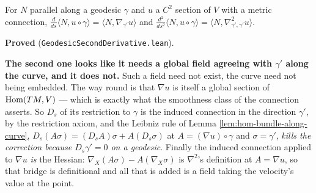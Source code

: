 \begin{lemma}
  \label{lem:geodesic-second-derivative}
  \leanok
  For $N$ parallel along a geodesic $\gamma$ and $u$ a $C^2$ section of $V$ with a metric
  connection,
  $\frac{d}{ds}\langle N, u\circ\gamma\rangle = \langle N, \nabla_{\gamma'}u\rangle$ and
  $\frac{d^2}{ds^2}\langle N, u\circ\gamma\rangle
   = \langle N, \nabla^2_{\gamma',\gamma'}u\rangle$.

  \textbf{Proved} (\texttt{GeodesicSecondDerivative.lean}).

  \textbf{The second one looks like it needs a global field agreeing with $\gamma'$ along the
  curve, and it does not.} Such a field need not exist, the curve need not being embedded. The
  way round is that $\nabla u$ is itself a global section of $\operatorname{Hom}(TM,V)$ ---
  which is exactly what the smoothness class of the connection asserts. So $D_s$ of its
  restriction to $\gamma$ is the induced connection in the direction $\gamma'$, by the
  restriction axiom, and the Leibniz rule of Lemma \ref{lem:hom-bundle-along-curve},
  $D_s(A\sigma) = (D_sA)\sigma + A(D_s\sigma)$ at $A = (\nabla u)\circ\gamma$ and
  $\sigma = \gamma'$, \emph{kills the correction because $D_s\gamma' = 0$ on a geodesic}.
  Finally the induced connection applied to $\nabla u$ \emph{is} the Hessian:
  $\nabla_X(A\sigma) - A(\nabla_X\sigma)$ is $\nabla^2$'s definition at $A = \nabla u$, so
  that bridge is definitional and all that is added is a field taking the velocity's value at
  the point.


\end{lemma}
